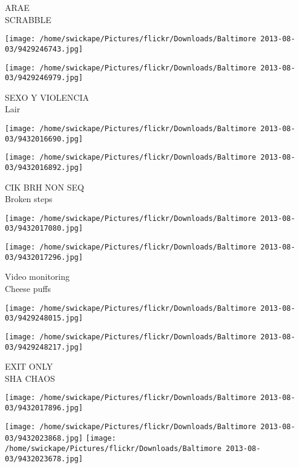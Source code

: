 \documentclass[10pt,letterpaper]{article}
\begin{document}
ARAE\\
SCRABBLE\\
\pagebreak

\texttt{[image: /home/swickape/Pictures/flickr/Downloads/Baltimore 2013-08-03/9429246743.jpg]}

\vspace{0.25in}
\texttt{[image: /home/swickape/Pictures/flickr/Downloads/Baltimore 2013-08-03/9429246979.jpg]}

SEXO Y VIOLENCIA\\
Lair\\
\pagebreak

\texttt{[image: /home/swickape/Pictures/flickr/Downloads/Baltimore 2013-08-03/9432016690.jpg]}

\vspace{0.25in}
\texttt{[image: /home/swickape/Pictures/flickr/Downloads/Baltimore 2013-08-03/9432016892.jpg]}

CIK BRH NON SEQ\\
Broken steps\\
\pagebreak

\texttt{[image: /home/swickape/Pictures/flickr/Downloads/Baltimore 2013-08-03/9432017080.jpg]}

\vspace{0.25in}
\texttt{[image: /home/swickape/Pictures/flickr/Downloads/Baltimore 2013-08-03/9432017296.jpg]}

Video monitoring\\
Cheese puffs\\
\pagebreak

\texttt{[image: /home/swickape/Pictures/flickr/Downloads/Baltimore 2013-08-03/9429248015.jpg]}

\vspace{0.25in}
\texttt{[image: /home/swickape/Pictures/flickr/Downloads/Baltimore 2013-08-03/9429248217.jpg]}

EXIT ONLY\\
SHA CHAOS\\
\pagebreak

\texttt{[image: /home/swickape/Pictures/flickr/Downloads/Baltimore 2013-08-03/9432017896.jpg]}

\vspace{0.25in}
\texttt{[image: /home/swickape/Pictures/flickr/Downloads/Baltimore 2013-08-03/9432023868.jpg]}
\texttt{[image: /home/swickape/Pictures/flickr/Downloads/Baltimore 2013-08-03/9432023678.jpg]}
\end{document}
